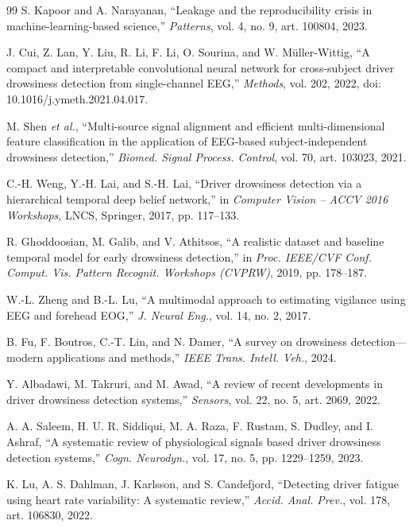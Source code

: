 \documentclass[journal]{IEEEtran}
\begin{document}
\begin{thebibliography}{99}
S. Kapoor and A. Narayanan, ``Leakage and the reproducibility crisis in
machine-learning-based science,'' \emph{Patterns}, vol. 4, no. 9,
art. 100804, 2023.

J. Cui, Z. Lan, Y. Liu, R. Li, F. Li, O. Sourina, and W. M\"uller-Wittig, ``A
compact and interpretable convolutional neural network for cross-subject
driver drowsiness detection from single-channel EEG,'' \emph{Methods},
vol. 202, 2022, doi: 10.1016/j.ymeth.2021.04.017.

M. Shen \emph{et al.}, ``Multi-source signal alignment and efficient
multi-dimensional feature classification in the application of EEG-based
subject-independent drowsiness detection,'' \emph{Biomed. Signal Process.
Control}, vol. 70, art. 103023, 2021.

C.-H. Weng, Y.-H. Lai, and S.-H. Lai, ``Driver drowsiness detection via a
hierarchical temporal deep belief network,'' in \emph{Computer Vision -- ACCV
2016 Workshops}, LNCS, Springer, 2017, pp. 117--133.

R. Ghoddoosian, M. Galib, and V. Athitsos, ``A realistic dataset and baseline
temporal model for early drowsiness detection,'' in \emph{Proc. IEEE/CVF Conf.
Comput. Vis. Pattern Recognit. Workshops (CVPRW)}, 2019, pp. 178--187.

W.-L. Zheng and B.-L. Lu, ``A multimodal approach to estimating vigilance
using EEG and forehead EOG,'' \emph{J. Neural Eng.}, vol. 14, no. 2, 2017.

B. Fu, F. Boutros, C.-T. Lin, and N. Damer, ``A survey on drowsiness
detection---modern applications and methods,'' \emph{IEEE Trans. Intell.
Veh.}, 2024.

Y. Albadawi, M. Takruri, and M. Awad, ``A review of recent developments in
driver drowsiness detection systems,'' \emph{Sensors}, vol. 22, no. 5,
art. 2069, 2022.

A. A. Saleem, H. U. R. Siddiqui, M. A. Raza, F. Rustam, S. Dudley, and
I. Ashraf, ``A systematic review of physiological signals based driver
drowsiness detection systems,'' \emph{Cogn. Neurodyn.}, vol. 17, no. 5,
pp. 1229--1259, 2023.

K. Lu, A. S. Dahlman, J. Karlsson, and S. Candefjord, ``Detecting driver
fatigue using heart rate variability: A systematic review,'' \emph{Accid.
Anal. Prev.}, vol. 178, art. 106830, 2022.


\end{thebibliography}
\end{document}
